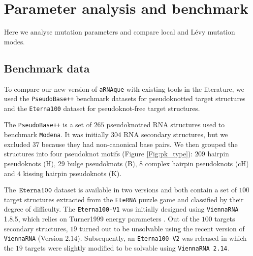 \section*{Parameter analysis and benchmark}
Here we analyse mutation parameters and compare local and Lévy mutation modes. 

\subsection*{Benchmark data}
To compare our new version of \texttt{aRNAque} with existing tools in the literature, we used the \texttt{PseudoBase++} benchmark datasets for  pseudoknotted target structures and the \texttt{Eterna100} dataset for pseudoknot-free target structures.

The \texttt{PseudoBase++} is a set of $265$ pseudoknotted RNA structures used to benchmark \texttt{Modena}. It was initially $304$ RNA secondary structures, but we excluded $37$ because they had non-canonical base pairs. We then grouped the structures into four pseudoknot motifs (Figure \ref{Fig:pk_type}): $209$ hairpin pseudoknots (H), $29$ bulge pseudoknots (B), $8$ complex hairpin pseudoknots (cH) and $4$ kissing hairpin pseudoknots (K).  

The~\(\texttt{Eterna100}\) dataset \cite{Eterna} is available in two versions and both contain a set of \(100\) target structures extracted from the \texttt{EteRNA} puzzle game and classified by their degree of difficulty. The \texttt{Eterna100-V1} was initially designed using \texttt{ViennaRNA} 1.8.5, which relies on Turner1999 energy parameters \cite{Turn1999}. Out of the $100$ targets secondary structures, $19$ turned out to be unsolvable using the recent version of \texttt{ViennaRNA} (Version $2.14$). Subsequently, an \texttt{Eterna100-V2} \cite{Eterna} was released in which the $19$ targets were slightly modified to be solvable using \texttt{ViennaRNA 2.14}. 

